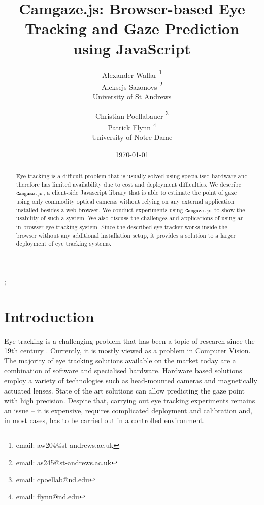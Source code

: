 \documentclass[annual]{acmsiggraph}
\title{Camgaze.js: Browser-based Eye Tracking and Gaze Prediction using
JavaScript}
\author{Alexander Wallar \thanks{email: aw204@st-andrews.ac.uk} \\ Aleksejs
Sazonovs \thanks{email: as245@st-andrews.ac.uk} \\ University of St Andrews
\and Christian Poellabauer \thanks{email: cpoellab@nd.edu} \\ Patrick Flynn
\thanks{email: flynn@nd.edu} \\ University of Notre Dame}
\date{\today}
\newcommand{\Acronym}[1]{\ensuremath{{\small{\texttt{#1}}}}}
\newcommand{\Name}{\Acronym{Camgaze.js}} \newcommand{\False}{\Constant{false}}
\newcommand{\Constant}[1]{\ensuremath{\small{\texttt{#1}}}}
\begin{document}
\maketitle

\begin{abstract}

Eye tracking is a difficult problem that is usually solved using specialised
hardware and therefore has limited availability due to cost and deployment
difficulties. We describe $\Name$, a client-side Javascript library that is
able to estimate the point of gaze using only commodity optical cameras without
relying on any external application installed besides a web-browser. We conduct
experiments using $\Name$ to show the usability of such a system.  We also
discuss the challenges and applications of using an in-browser eye tracking
system. Since the described eye tracker works inside the browser without any
additional installation setup, it provides a solution to a larger deployment of
eye tracking systems.

\end{abstract}

\begin{CRcatlist} ;

\end{CRcatlist}

\keywordlist


\copyrightspace

\section{Introduction}

Eye tracking is a challenging problem that has been a topic of research
since the 19th century \cite{Wade2010}. Currently, it is mostly viewed as a
problem in Computer Vision. The majority of eye tracking solutions available on
the market today are a combination of software and specialised hardware.
Hardware based solutions employ a variety of technologies such as head-mounted
cameras and magnetically actuated lenses. State of the art solutions can allow
predicting the gaze point with high precision.  Despite that, carrying out eye
tracking experiments remains an issue -- it is expensive, requires complicated
deployment and calibration and, in most cases, has to be carried out in a
controlled environment.
\end{document}
